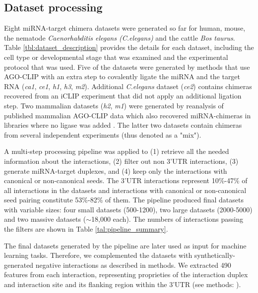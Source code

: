 \documentclass{bmcart}
\begin{document}
\subsection*{Dataset processing}
Eight miRNA-target chimera datasets were generated so far for human, mouse, the nematode \textit{Caenorhabditis elegans (C.elegans)} and the cattle \textit{Bos taurus}.
Table \ref{tbl:dataset_description} provides the details for each dataset, including the cell type or developmental stage that was examined and the experimental protocol that was used. Five of the datasets were generated by methods that use AGO-CLIP with an extra step to covalently ligate the miRNA and the target RNA (\textit{ca1}, \textit{ce1}, \textit{h1},  \textit{h3}, \textit{m2}). Additional \textit{C.elegans} dataset (\textit{ce2}) contains chimeras recovered from an iCLIP experiment that did not apply an additional ligation step. Two mammalian datasets (\textit{h2}, \textit{m1}) were generated by reanalysis of published mammalian AGO-CLIP data which also recovered miRNA-chimeras in libraries where no ligase was added \cite{grosswendt2014unambiguous}. The latter two datasets contain chimeras from several independent experiments (thus denoted as a "mix").

A multi-step processing pipeline was applied to (1) retrieve all the needed information about the interactions, (2) filter out non 3'UTR interactions, (3) generate miRNA-target duplexes, and (4) keep only the interactions with canonical or non-canonical seeds. The 3'UTR interactions represent 10\%-47\% of all interactions in the datasets and interactions with canonical or non-canonical seed pairing constitute 53\%-82\% of them. The pipeline produced final datasets with variable sizes: four small datasets (500-1200), two large datasets (2000-5000) and two massive datasets ($\sim$18,000 each). The numbers of interactions passing the filters are shown in Table \ref{tal:pipeline_summary}.

The final datasets generated by the pipeline are later used as input for machine learning tasks. Therefore, we complemented the datasets with synthetically-generated negative interactions as described in methods. We extracted 490 features from each interaction, representing proprieties of the interaction duplex and interaction site and its flanking region within the 3'UTR (see methods: ).
\end{document}
